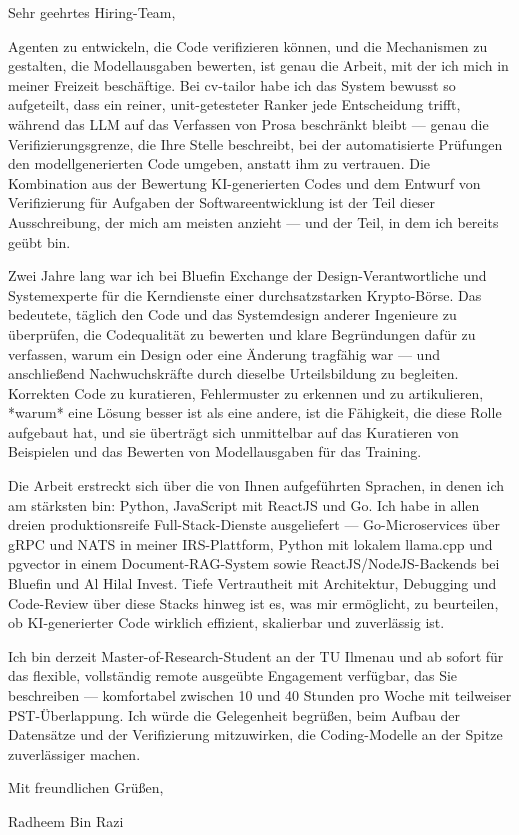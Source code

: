 \documentclass[11pt,a4paper]{coverletter}
\begin{document}
\opening{Sehr geehrtes Hiring-Team,}

Agenten zu entwickeln, die Code verifizieren können, und die Mechanismen zu gestalten, die Modellausgaben bewerten, ist genau die Arbeit, mit der ich mich in meiner Freizeit beschäftige. Bei cv-tailor habe ich das System bewusst so aufgeteilt, dass ein reiner, unit-getesteter Ranker jede Entscheidung trifft, während das LLM auf das Verfassen von Prosa beschränkt bleibt — genau die Verifizierungsgrenze, die Ihre Stelle beschreibt, bei der automatisierte Prüfungen den modellgenerierten Code umgeben, anstatt ihm zu vertrauen. Die Kombination aus der Bewertung KI-generierten Codes und dem Entwurf von Verifizierung für Aufgaben der Softwareentwicklung ist der Teil dieser Ausschreibung, der mich am meisten anzieht — und der Teil, in dem ich bereits geübt bin.

Zwei Jahre lang war ich bei Bluefin Exchange der Design-Verantwortliche und Systemexperte für die Kerndienste einer durchsatzstarken Krypto-Börse. Das bedeutete, täglich den Code und das Systemdesign anderer Ingenieure zu überprüfen, die Codequalität zu bewerten und klare Begründungen dafür zu verfassen, warum ein Design oder eine Änderung tragfähig war — und anschließend Nachwuchskräfte durch dieselbe Urteilsbildung zu begleiten. Korrekten Code zu kuratieren, Fehlermuster zu erkennen und zu artikulieren, *warum* eine Lösung besser ist als eine andere, ist die Fähigkeit, die diese Rolle aufgebaut hat, und sie überträgt sich unmittelbar auf das Kuratieren von Beispielen und das Bewerten von Modellausgaben für das Training.

Die Arbeit erstreckt sich über die von Ihnen aufgeführten Sprachen, in denen ich am stärksten bin: Python, JavaScript mit ReactJS und Go. Ich habe in allen dreien produktionsreife Full-Stack-Dienste ausgeliefert — Go-Microservices über gRPC und NATS in meiner IRS-Plattform, Python mit lokalem llama.cpp und pgvector in einem Document-RAG-System sowie ReactJS/NodeJS-Backends bei Bluefin und Al Hilal Invest. Tiefe Vertrautheit mit Architektur, Debugging und Code-Review über diese Stacks hinweg ist es, was mir ermöglicht, zu beurteilen, ob KI-generierter Code wirklich effizient, skalierbar und zuverlässig ist.

Ich bin derzeit Master-of-Research-Student an der TU Ilmenau und ab sofort für das flexible, vollständig remote ausgeübte Engagement verfügbar, das Sie beschreiben — komfortabel zwischen 10 und 40 Stunden pro Woche mit teilweiser PST-Überlappung. Ich würde die Gelegenheit begrüßen, beim Aufbau der Datensätze und der Verifizierung mitzuwirken, die Coding-Modelle an der Spitze zuverlässiger machen.

\closing{Mit freundlichen Grüßen,}{Radheem Bin Razi}
\end{document}

